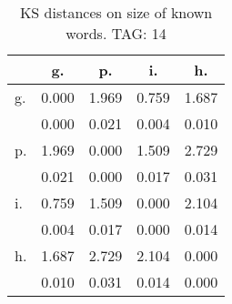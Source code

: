 \begin{table}[h!]
\begin{center}
\begin{tabular}{| l | c | c | c | c |}\hline
 & g. & p. & i. & h. \\\hline
g. & 0.000  & 1.969  & 0.759  & 1.687 \\\hline
 & 0.000  & 0.021  & 0.004  & 0.010 \\\hline
p. & 1.969  & 0.000  & 1.509  & 2.729 \\\hline
 & 0.021  & 0.000  & 0.017  & 0.031 \\\hline
i. & 0.759  & 1.509  & 0.000  & 2.104 \\\hline
 & 0.004  & 0.017  & 0.000  & 0.014 \\\hline
h. & 1.687  & 2.729  & 2.104  & 0.000 \\\hline
 & 0.010  & 0.031  & 0.014  & 0.000 \\\hline
\end{tabular}
\caption{KS distances on size of known words. TAG: 14}
\end{center}
\end{table}
